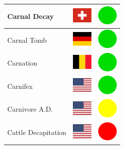\documentclass[12pt, a4paper, twoside]{report}
\begin{document}
\begin{center}
\begin{longtable}{|p{5cm}|p{2cm}|p{2cm}|}
 Carnal Decay                                               & \includegraphics[width=1cm]{../img/flags/ch} &   \includegraphics[width=1cm]{../likes/y} \\ \hline
 Carnal Tomb                                                & \includegraphics[width=1cm]{../img/flags/de} &   \includegraphics[width=1cm]{../likes/y} \\ \hline
 Carnation                                                  & \includegraphics[width=1cm]{../img/flags/be} &   \includegraphics[width=1cm]{../likes/y} \\ \hline
 Carnifex                                                   & \includegraphics[width=1cm]{../img/flags/us} &   \includegraphics[width=1cm]{../likes/y} \\ \hline
 Carnivore A.D.                                             & \includegraphics[width=1cm]{../img/flags/us} &   \includegraphics[width=1cm]{../likes/m} \\ \hline
 Cattle Decapitation                                        & \includegraphics[width=1cm]{../img/flags/us} &   \includegraphics[width=1cm]{../likes/n} \\ \hline

\end{longtable}
\end{center}
\end{document}

